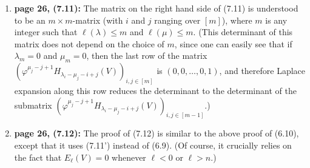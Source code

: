 \documentclass[numbers=enddot,12pt,final,onecolumn,notitlepage]{scrartcl}%
\theoremstyle{definition}
\newenvironment{proof}[1][Proof]{\noindent\textbf{#1.} }{\ \rule{0.5em}{0.5em}}
\let\prodnonlimits\prod
\renewcommand{\prod}{\prodnonlimits\limits}
\begin{document}
\begin{enumerate}
\begin{proof}
\begin{align*}
{{}\left(  \prod_{i=1}^{p}\left(  -1\right)  ^{\lambda_{i}^{\prime}-i}\right)
\left(  \prod_{j=1}^{p}\left(  -1\right)  ^{\mu_{j}^{\prime}-j}\right)
}_{\substack{=1\\\text{(by Lemma \ref{lem.A6prods})}}}\\
&  \ \ \ \ \ \ \ \ \ \ \cdot\det\left(  \varphi^{j-\mu_{j}^{\prime}%
-1}E_{\lambda_{i}^{\prime}-\mu_{j}^{\prime}-i+j}\left(  V\right)  \right)
_{i,j\in\left[  p\right]  }\\
&  =\det\left(  \varphi^{j-\mu_{j}^{\prime}-1}E_{\lambda_{i}^{\prime}-\mu
_{j}^{\prime}-i+j}\left(  V\right)  \right)  _{i,j\in\left[  p\right]  }\\
&  =\det\left(  \varphi^{-\mu_{j}^{\prime}+j-1}E_{\lambda_{i}^{\prime}-\mu
_{j}^{\prime}-i+j}\left(  V\right)  \right)  _{i,j\in\left[  p\right]
}\ \ \ \ \ \ \ \ \ \ \left(  \text{since }j-\mu_{j}^{\prime}-1=-\mu
_{j}^{\prime}+j-1\right)  .
\end{align*}
In view of (7.11), this can be rewritten as%
\[
S_{\lambda/\mu}\left(  V\right)  =\det\left(  \varphi^{-\mu_{j}^{\prime}%
+j-1}E_{\lambda_{i}^{\prime}-\mu_{j}^{\prime}-i+j}\left(  V\right)  \right)
_{i,j\in\left[  p\right]  }.
\]
This proves (7.11').
\end{proof}

Applying (7.11') to $\mu=\varnothing$, we obtain the second equality in (7.10).

\item \textbf{page 26, (7.11):} The matrix on the right hand side of (7.11) is
understood to be an $m\times m$-matrix (with $i$ and $j$ ranging over $\left[
m\right]  $), where $m$ is any integer such that $\ell\left(  \lambda\right)
\leq m$ and $\ell\left(  \mu\right)  \leq m$. (This determinant of this matrix
does not depend on the choice of $m$, since one can easily see that if
$\lambda_{m}=0$ and $\mu_{m}=0$, then the last row of the matrix $\left(
\varphi^{\mu_{j}-j+1}H_{\lambda_{i}-\mu_{j}-i+j}\left(  V\right)  \right)
_{i,j\in\left[  m\right]  }$ is $\left(  0,0,\ldots,0,1\right)  $, and
therefore Laplace expansion along this row reduces the determinant to the
determinant of the submatrix $\left(  \varphi^{\mu_{j}-j+1}H_{\lambda_{i}%
-\mu_{j}-i+j}\left(  V\right)  \right)  _{i,j\in\left[  m-1\right]  }$.)

\item \textbf{page 26, (7.12):} The proof of (7.12) is similar to the above
proof of (6.10), except that it uses (7.11') instead of (6.9). (Of course, it
crucially relies on the fact that $E_{\ell}\left(  V\right)  =0$ whenever
$\ell<0$ or $\ell>n$.)


\end{enumerate}
\end{document}
